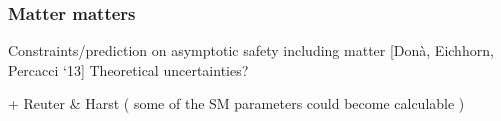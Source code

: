 \documentclass[]{beamer}  %
\begin{document}


\begin{frame}
  \frametitle{Matter matters}

  Constraints/prediction on asymptotic safety including matter
  [Don\`a, Eichhorn, Percacci `13]
  Theoretical uncertainties?

  + Reuter \& Harst ( some of the SM parameters could become calculable )

\end{frame}


\end{document}
